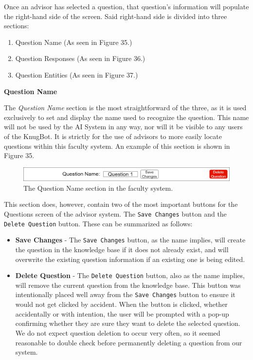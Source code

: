 \documentclass[titlepage, 12pt]{article}
\begin{document}
Once an advisor has selected a question, that question’s information will populate the right-hand side of the screen. Said right-hand side is divided into three sections:

\begin{enumerate}
    \item Question Name (As seen in Figure 35.)
    \item Question Responses (As seen in Figure 36.)
    \item Question Entities (As seen in Figure 37.)
\end{enumerate}

\textbf{Question Name}

The \emph{Question Name} section is the most straightforward of the three, as it is used exclusively to set and display the name used to recognize the question. This name will not be used by the AI System in any way, nor will it be visible to any users of the KnugBot. It is strictly for the use of advisors to more easily locate questions within this faculty system. An example of this section is shown in Figure 35.

\begin{figure}[h]
    \centering\includegraphics[width=1\linewidth]{images/system-design/faculty-questions-name.png}
    \caption{The Question Name section in the faculty system.}
\end{figure}

This section does, however, contain two of the most important buttons for the Questions screen of the advisor system. The \texttt{Save Changes} button and the \texttt{Delete Question} button. These can be summarized as follows:

\begin{itemize}
    \item \textbf{Save Changes} - The \texttt{Save Changes} button, as the name implies, will create the question in the knowledge base if it does not already exist, and will overwrite the existing question information if an existing one is being edited.
    \item \textbf{Delete Question} - The \texttt{Delete Question} button, also as the name implies, will remove the current question from the knowledge base. This button was intentionally placed well away from the \texttt{Save Changes} button to ensure it would not get clicked by accident. When the button is clicked, whether accidentally or with intention, the user will be prompted with a pop-up confirming whether they are sure they want to delete the selected question. We do not expect question deletion to occur very often, so it seemed reasonable to double check before permanently deleting a question from our system.
\end{itemize}
\end{document}
